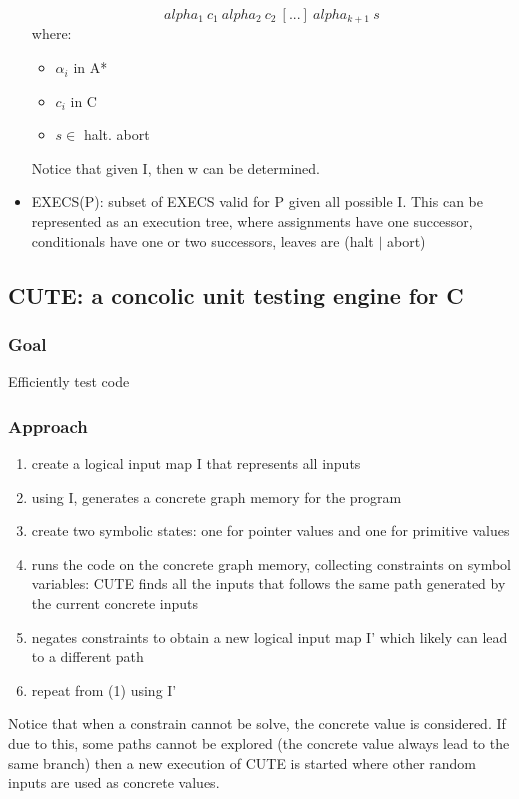 \documentclass[10pt, a4paper]{article}
\begin{document}
\begin{itemize}
    \[ alpha_1~c_1~alpha_2~c_2~[...]~alpha_{k+1}~s \]
    where:
      \begin{itemize}
        \item $\alpha_i$ in A*
        \item $c_i$ in C
        \item $s \in$ {halt. abort}
      \end{itemize}
      Notice that given I, then w can be determined.
    \item EXECS(P): subset of EXECS valid for P given all possible I. This can be represented as an execution tree, where assignments have one successor, conditionals have one or two successors, leaves are (halt $|$ abort)

\end{itemize}

\subsection{\cite{CUTE-FSE13} CUTE: a concolic unit testing engine for C} 

\subsubsection{Goal}
Efficiently test code

\subsubsection{Approach}

\begin{enumerate}
  \item create a logical input map I that represents all inputs
  \item using I, generates a concrete graph memory for the program
  \item create two symbolic states: one for pointer values and one for primitive values
  \item runs the code on the concrete graph memory, collecting constraints on symbol variables: CUTE finds all the inputs that follows the same path generated by the current concrete inputs
  \item negates constraints to obtain a new logical input map I' which likely can lead to a different path
  \item repeat from (1) using I'
\end{enumerate}


Notice that when a constrain cannot be solve, the concrete value is considered. If due to this, some paths cannot be explored (the concrete value always lead to the same branch) then a new execution of CUTE is started where other random inputs are used as concrete values.
\end{document}

